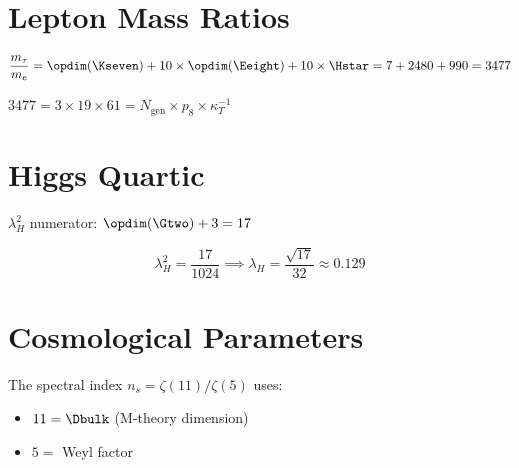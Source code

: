\section{Lepton Mass Ratios}

\begin{theorem}\label{thm:m_tau_m_e}
    \leanok
    \[
        \frac{m_\tau}{m_e} = \opdim(\Kseven) + 10 \times \opdim(\Eeight) + 10 \times \Hstar
        = 7 + 2480 + 990 = 3477
    \]
\end{theorem}

\begin{theorem}\label{thm:m_tau_m_e_factorization}
    \leanok
    $3477 = 3 \times 19 \times 61 = N_{\mathrm{gen}} \times p_8 \times \kappa_T^{-1}$
\end{theorem}

\section{Higgs Quartic}

\begin{definition}\label{def:lambda_H_num}
    \leanok
    $\lambda_H^2$ numerator: $\opdim(\Gtwo) + 3 = 17$
\end{definition}

\begin{theorem}\label{thm:lambda_H}
    \leanok
    \[
        \lambda_H^2 = \frac{17}{1024} \implies \lambda_H = \frac{\sqrt{17}}{32} \approx 0.129
    \]
\end{theorem}

\section{Cosmological Parameters}

\begin{theorem}\label{thm:n_s_indices}
    \leanok
    The spectral index $n_s = \zeta(11)/\zeta(5)$ uses:
    \begin{itemize}
        \item $11 = \Dbulk$ (M-theory dimension)
        \item $5 = $ Weyl factor
    \end{itemize}
\end{theorem}

